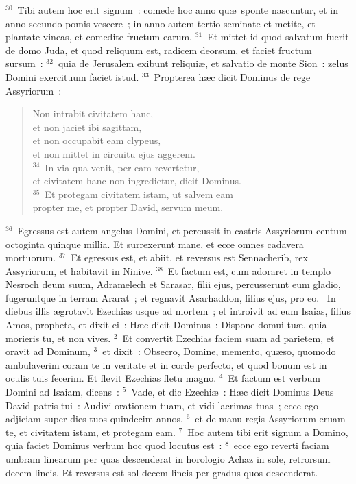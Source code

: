 ${}^{30}$~Tibi autem hoc erit signum~: comede hoc anno qu\ae\ sponte nascuntur, et in anno secundo pomis vescere~; in anno autem tertio seminate et metite, et plantate vineas, et comedite fructum earum.
${}^{31}$~Et mittet id quod salvatum fuerit de domo Juda, et quod reliquum est, radicem deorsum, et faciet fructum sursum~:
${}^{32}$~quia de Jerusalem exibunt reliqui\ae , et salvatio de monte Sion~: zelus Domini exercituum faciet istud.
${}^{33}$~Propterea h\ae c dicit Dominus de rege Assyriorum~: \begin{flushleft}\begin{verse}Non intrabit civitatem hanc,\\ et non jaciet ibi sagittam,\\ et non occupabit eam clypeus,\\ et non mittet in circuitu ejus aggerem.\\
${}^{34}$~In via qua venit, per eam revertetur,\\ et civitatem hanc non ingredietur, dicit Dominus.\\
${}^{35}$~Et protegam civitatem istam, ut salvem eam\\ propter me, et propter David, servum meum.\end{verse}\end{flushleft}


${}^{36}$~Egressus est autem angelus Domini, et percussit in castris Assyriorum centum octoginta quinque millia. Et surrexerunt mane, et ecce omnes cadavera mortuorum.
${}^{37}$~Et egressus est, et abiit, et reversus est Sennacherib, rex Assyriorum, et habitavit in Ninive.
${}^{38}$~Et factum est, cum adoraret in templo Nesroch deum suum, Adramelech et Sarasar, filii ejus, percusserunt eum gladio, fugeruntque in terram Ararat~; et regnavit Asarhaddon, filius ejus, pro eo.
~\lettrine[lines=10,image=true,loversize=0.05,lraise=-0.03]{I}{}n diebus illis \ae grotavit Ezechias usque ad mortem~; et introivit ad eum Isaias, filius Amos, propheta, et dixit ei~: H\ae c dicit Dominus~: Dispone domui tu\ae , quia morieris tu, et non vives.
${}^{2}$~Et convertit Ezechias faciem suam ad parietem, et oravit ad Dominum,
${}^{3}$~et dixit~: Obsecro, Domine, memento, qu\ae so, quomodo ambulaverim coram te in veritate et in corde perfecto, et quod bonum est in oculis tuis fecerim. Et flevit Ezechias fletu magno.
${}^{4}$~Et factum est verbum Domini ad Isaiam, dicens~:
${}^{5}$~Vade, et dic Ezechi\ae~: H\ae c dicit Dominus Deus David patris tui~: Audivi orationem tuam, et vidi lacrimas tuas~; ecce ego adjiciam super dies tuos quindecim annos,
${}^{6}$~et de manu regis Assyriorum eruam te, et civitatem istam, et protegam eam.
${}^{7}$~Hoc autem tibi erit signum a Domino, quia faciet Dominus verbum hoc quod locutus est~:
${}^{8}$~ecce ego reverti faciam umbram linearum per quas descenderat in horologio Achaz in sole, retrorsum decem lineis. Et reversus est sol decem lineis per gradus quos descenderat.


